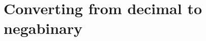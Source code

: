 \documentclass[11pt,a4paper]{article}
\author{Christian Rinderknecht}
\date{14 December 2007}
\begin{document}
\maketitle
\thispagestyle{empty}

\allowdisplaybreaks

\section{Converting from decimal to negabinary}


\end{document}
